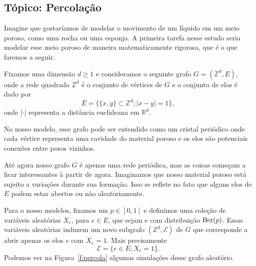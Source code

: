 \begin{topics}

\section{Tópico: Percolação}

Imagine que gostaríamos de modelar o movimento de um líquido em um meio poroso, como uma rocha ou uma esponja.
A primeira tarefa nesse estudo seria modelar esse meio poroso de maneira matematicamente rigorosa, que é o que faremos a seguir.

Fixamos uma dimensão $d \geq 1$ e consideramos o seguinte grafo $G = (\mathbb{Z}^d, E)$, onde a rede quadrada $\mathbb{Z}^d$ é o conjunto de vértices de $G$ e o conjunto de elos é dado por
\begin{equation*}
  E = \big\{ \{x, y\} \subset \mathbb{Z}^d; |x - y| = 1 \},
\end{equation*}
onde $|\cdot|$ representa a distância euclideana em $\mathbb{R}^d$.

No nosso modelo, esse grafo pode ser entendido como um cristal periódico onde cada vértice representa uma cavidade do material poroso e os elos são potenciais conexões entre poros vizinhos.

Até agora nosso grafo $G$ é apenas uma rede periódica, mas as coisas começam a ficar interessantes à partir de agora.
Imaginamos que nosso material poroso está sujeito a variações durante sua formação.
Isso se reflete no fato que alguns elos de $E$ podem estar abertos ou não aleatoriamente.

Para o nosso modelos, fixamos um $p \in [0,1]$ e definimos uma coleção de variáveis aleatórias $X_e$, para $e \in E$, que sejam \iid e com distribuição $\operatorname{Ber}(p)$.
Essas variáveis aleatórias induzem um novo subgrafo $(\mathbb{Z}^d, \mathcal{E})$ de $G$ que corresponde a abrir apenas os elos $e$ com $X_e = 1$.
Mais precisamente
\begin{equation}
  \mathcal{E} = \big\{ e \in E; X_e = 1 \big\}.
\end{equation}
Podemos ver na Figura~\ref{f:percola} algumas simulações desse grafo aleatório.


\end{topics}
